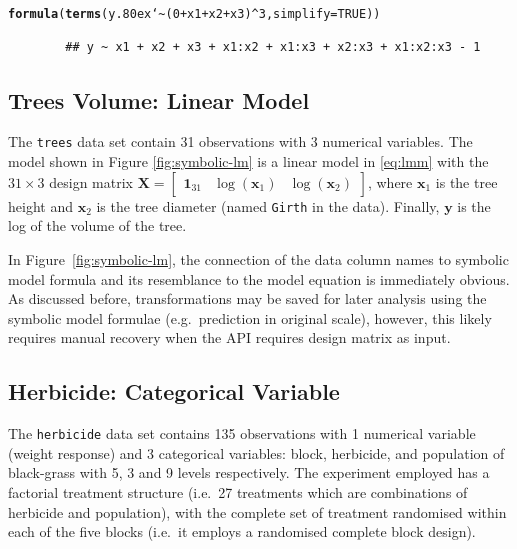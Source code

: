 \documentclass[runningheads]{llncs}\usepackage[]{graphicx}\usepackage[]{color}
\makeatletter
\newcommand{\hlnum}[1]{\textcolor[rgb]{0.686,0.059,0.569}{#1}}%
\newcommand{\hlopt}[1]{\textcolor[rgb]{0,0,0}{#1}}%
\newcommand{\hlstd}[1]{\textcolor[rgb]{0.345,0.345,0.345}{#1}}%
\newcommand{\hlkwc}[1]{\textcolor[rgb]{0.333,0.667,0.333}{#1}}%
\newcommand{\hlkwd}[1]{\textcolor[rgb]{0.737,0.353,0.396}{\textbf{#1}}}%
\newenvironment{kframe}{%
 \def\at@end@of@kframe{}%
 \ifinner\ifhmode%
  \def\at@end@of@kframe{\end{minipage}}%
  \begin{minipage}{\columnwidth}%
 \fi\fi%
 \def\FrameCommand##1{\hskip\@totalleftmargin \hskip-\fboxsep
 \colorbox{shadecolor}{##1}\hskip-\fboxsep
     \hskip-\linewidth \hskip-\@totalleftmargin \hskip\columnwidth}%
 \MakeFramed {\advance\hsize-\width
   \@totalleftmargin\z@ \linewidth\hsize
   \@setminipage}}%
 {\par\unskip\endMakeFramed%
 \at@end@of@kframe}
\newenvironment{knitrout}{}{} %
\newcommand{\mytilde}{\lower.80ex\hbox{\char`\~}}
\makeatother
\begin{document}
\begin{knitrout}
	\color{fgcolor}\begin{kframe}
		\begin{alltt}
			\hlkwd{formula}\hlstd{(}\hlkwd{terms}\hlstd{(y} \hlopt{\mytilde} \hlstd{(}\hlnum{0} \hlopt{+} \hlstd{x1} \hlopt{+} \hlstd{x2} \hlopt{+} \hlstd{x3)}\hlopt{^}\hlnum{3}\hlstd{,} \hlkwc{simplify} \hlstd{=} \hlnum{TRUE}\hlstd{))}
		\end{alltt}
		\begin{verbatim}
		## y ~ x1 + x2 + x3 + x1:x2 + x1:x3 + x2:x3 + x1:x2:x3 - 1
		\end{verbatim}
	\end{kframe}
\end{knitrout}


\hypertarget{trees}{%
	\subsection{Trees Volume: Linear Model}\label{trees}}

The \texttt{trees} data set \citep[original data source from][built-in data in R]{minitab} contain 31 observations with 3 numerical variables. The model shown in Figure \ref{fig:symbolic-lm} is a linear model in \eqref{eq:lmm} with the \(31\times 3\) design matrix \(\mathbf{X} = \begin{bmatrix}\boldsymbol{1}_{31} & \log(\boldsymbol{x}_1) & \log(\boldsymbol{x}_2)\end{bmatrix}\), where \(\boldsymbol{x}_1\) is the tree height and \(\boldsymbol{x}_2\) is the tree diameter (named \texttt{Girth} in the data). Finally, \(\boldsymbol{y}\) is the log of the volume of the tree. 

In Figure~\ref{fig:symbolic-lm}, the connection of the data column names to symbolic model formula and its resemblance to the model equation is immediately obvious. As discussed before, transformations may be saved for later analysis using the symbolic model formulae (e.g.~prediction in original scale), however, this likely requires manual recovery when the API requires design matrix as input. 

\hypertarget{grass}{%
	\subsection{Herbicide: Categorical Variable}\label{grass}}

The \texttt{herbicide} data set \citep[original source from R. Hull, Rothamsted Research, data sourced from][]{Welham2015} contains 135 observations with 1 numerical variable (weight response) and 3 categorical variables: block, herbicide, and population of black-grass with 5, 3 and 9 levels respectively. The experiment employed has a factorial treatment structure (i.e.~27 treatments which are combinations of herbicide and population), with the complete set of treatment randomised within each of the five blocks (i.e.~it employs a randomised complete block design).
\end{document}
